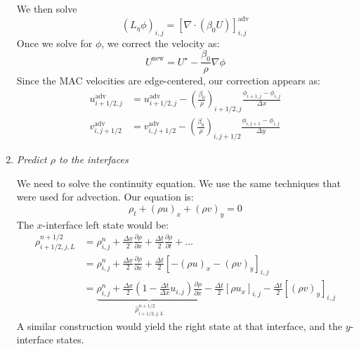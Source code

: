 \begin{enumerate}
  We then solve
  \begin{equation}
    (L_\eta\phi)_{i,j} =
    \left [ \nabla \cdot (\beta_0 U) \right ]_{i,j}^\mathrm{adv}
  \end{equation}
  Once we solve for $\phi$, we correct the velocity as:
  \begin{equation}
    U^\mathrm{new} = U^\star - \frac{\beta_0}{\rho} \nabla \phi
  \end{equation}
  Since the MAC velocities are edge-centered, our correction appears as:
  \begin{align}
    u^\mathrm{adv}_{i+1/2,j} &= u^\mathrm{adv}_{i+1/2,j} -
    \left (\frac{\beta_0}{\rho}\right )_{i+1/2,j}
    \frac{\phi_{i+1,j} - \phi_{i,j}}{\Delta x} \\
    v^\mathrm{adv}_{i,j+1/2} &= v^\mathrm{adv}_{i,j+1/2} -
    \left (\frac{\beta_0}{\rho}\right )_{i,j+1/2}
    \frac{\phi_{i,j+1} - \phi_{i,j}}{\Delta y} 
  \end{align}
  
\item {\em Predict $\rho$ to the interfaces}

We need to solve the continuity equation.  We use the same techniques
that were used for advection.  Our equation is:
\begin{equation}
\rho_t + (\rho u)_x + (\rho v)_y = 0
\end{equation}
The $x$-interface left state would be:
\begin{align}
\rho_{i+1/2,j,L}^{n+1/2} &= \rho_{i,j}^n + 
   \frac{\Delta x}{2} \frac{\partial \rho}{\partial x} +
   \frac{\Delta t}{2} \frac{\partial \rho}{\partial t} + \ldots \nonumber \\
%
 &= \rho_{i,j}^n + 
    \frac{\Delta x}{2} \frac{\partial \rho}{\partial x} +
    \frac{\Delta t}{2} \left [ -(\rho u)_x -(\rho v)_y \right ]_{i,j} \nonumber\\
%
 &= \underbrace{\rho_{i,j}^n + 
   \frac{\Delta x}{2} \left ( 1 - \frac{\Delta t}{\Delta x} u_{i,j} \right )
        \frac{\partial \rho}{\partial x}}_{\hat{\rho}_{i+1/2,j,L}^{n+1/2}}
   - \frac{\Delta t}{2} \left [\rho u_x \right ]_{i,j} 
   - \frac{\Delta t}{2} \left [ (\rho v)_y \right ]_{i,j}
\end{align}
A similar construction would yield the right state at that interface, and the
$y$-interface states.


\end{enumerate}

